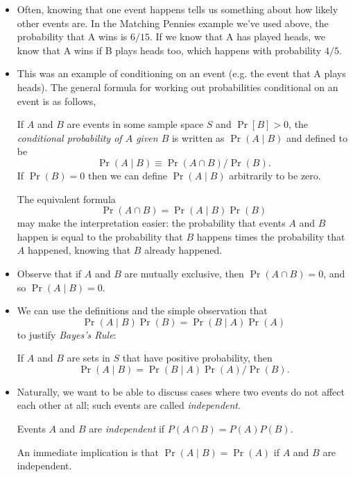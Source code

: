 \begin{itemize}
\item Often, knowing that one event happens tells us something about
  how likely other events are.  In the Matching Pennies example we've
  used above, the probability that A wins is $6/15$.  If we know that
  A has played heads, we know that A wins if B plays heads too, which
  happens with probability $4/5$.

\item This was an example of conditioning on an event (e.g. the event
  that A plays heads).  The general formula for working out
  probabilities conditional on an event is as follows,

  \begin{defn}
    If $A$ and $B$ are events in some sample space $S$ and $\Pr[B]>0$,
    the \emph{conditional probability of $A$ given $B$} is written as
    $\Pr(A ∣ B)$ and defined to be
    \begin{equation*}
      \Pr(A ∣ B) ≡ \Pr(A ∩ B) / \Pr(B).
    \end{equation*}
    If $\Pr(B) = 0$ then we can define $\Pr(A ∣ B)$ arbitrarily to be
    zero.
  \end{defn}

  The equivalent formula
  \begin{equation*}
    \Pr(A ∩ B) = \Pr(A ∣ B) \Pr(B)
  \end{equation*}
  may make the interpretation easier: the probability that events $A$
  and $B$ happen is equal to the probability that $B$ happens times
  the probability that $A$ happened, knowing that $B$ already
  happened.

\item Observe that if $A$ and $B$ are mutually exclusive, then $\Pr(A
  ∩ B) = 0$, and so $\Pr(A ∣ B) = 0$.

\item We can use the definitions and the simple observation that
  \begin{equation*}
    \Pr(A ∣ B) \Pr(B) = \Pr(B ∣ A) \Pr(A)
  \end{equation*}
  to justify \emph{Bayes's Rule}:
  \begin{thm}
    If $A$ and $B$ are sets in $S$ that have positive probability, then
    \begin{equation*}
      \Pr(A ∣ B) = \Pr(B ∣ A) \Pr(A) / \Pr(B).
    \end{equation*}
  \end{thm}

\item Naturally, we want to be able to discuss cases where two events
  do not affect each other at all; such events are called
  \emph{independent}.

  \begin{defn}
    Events $A$ and $B$ are \emph{independent} if $P(A ∩ B) = P(A)
    P(B)$.
  \end{defn}

  An immediate implication is that $\Pr(A ∣ B) = \Pr(A)$ if $A$ and
  $B$ are independent.

\end{itemize}

